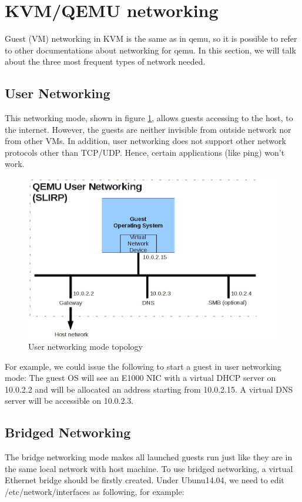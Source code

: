 \section{KVM/QEMU networking}
Guest (VM) networking in KVM is the same as in qemu, 
so it is possible to refer to other documentations about networking for qemu. 
In this section, we will talk about the three most frequent types of network needed.
\subsection{User Networking}
This networking mode, shown in figure \ref{fig:User networking mode topology}, allows guests accessing to the host, to the internet. 
However, the guests are neither invisible from outside network nor from other VMs. 
In addition, user networking does not support other network protocols other than TCP/UDP. 
Hence, certain applications (like ping) won't work.

\begin{figure}[htb]
	\centering
		\includegraphics[scale=0.5]{Figures/Figure9.png}
	\caption[User networking mode topology]{User networking mode topology}
	\label{fig:User networking mode topology}
\end{figure}

For example, we could issue the following to start a guest in user networking mode:
The guest OS will see an E1000 NIC with a virtual DHCP server on 10.0.2.2 and will be 
allocated an address starting from 10.0.2.15. A virtual DNS server will be accessible on 10.0.2.3.

\subsection{Bridged Networking}
The bridge networking mode makes all launched guests run just like they are in the same local network with host machine.  
To use bridged networking, a virtual Ethernet bridge should be firstly created. Under Ubunu14.04, 
we need to edit /etc/network/interfaces as following, for example:

